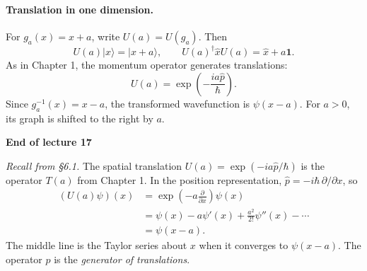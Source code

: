 \documentclass[11pt,a4paper]{article}
\begin{document}
\paragraph{Translation in one dimension.}
For $g_a(x)=x+a$, write $U(a)=U(g_a)$. Then
\[
    U(a)|x\rangle=|x+a\rangle,\qquad
    U(a)^\dagger\hat x U(a)=\hat x+a\mathbf 1 .
\]
As in Chapter 1, the momentum operator generates translations:
\[
    U(a)=\exp\!\left(-\frac{ia\hat p}{\hbar}\right).
\]
Since $g_a^{-1}(x)=x-a$, the transformed wavefunction is
$\psi(x-a)$. For $a>0$, its graph is shifted to the right by $a$.

\begin{center}
\end{center}

\begin{center}
    \textbf{End of lecture 17}
\end{center}

\noindent\textit{Recall from \S6.1.}
The spatial translation $U(a)=\exp(-ia\hat p/\hbar)$ is the operator
$T(a)$ from Chapter 1. In the position representation,
$\hat p=-i\hbar\,\partial/\partial x$, so
\begin{align*}
    (U(a)\psi)(x)
        &=\exp\!\left(-a\frac{\partial}{\partial x}\right)\psi(x)\\
        &=\psi(x)-a\psi'(x)+\frac{a^2}{2!}\psi''(x)-\cdots\\
        &=\psi(x-a).
\end{align*}
The middle line is the Taylor series about $x$ when it converges to
$\psi(x-a)$. The operator $\hat p$ is the \emph{generator of translations}.
\end{document}
